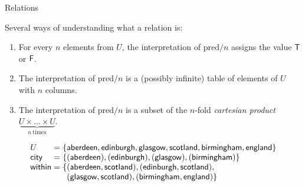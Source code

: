 \documentclass[xetex,aspectratio=169,14pt,hyperref={pdfpagelabels=true,pdflang={en-GB}}]{beamer}
\begin{document}
\begin{frame}
  {Relations}

  Several ways of understanding what a relation is:
  \begin{enumerate}
  \item For every $n$ elements from $U$, the interpretation of
    $\mathrm{pred}/n$ assigns the value $\mathsf{T}$ or $\mathsf{F}$.\\
    \bigskip
  \item The interpretation of $\mathrm{pred}/n$ is a (possibly
    infinite) table of elements of $U$ with $n$ columns.
    \bigskip
  \item The interpretation of $\mathrm{pred}/n$ is a subset of the
    $n$-fold \emph{cartesian product}
    $\underbrace{U \times \dots \times U}_{n~\mathrm{times}}$.\\
  \end{enumerate}
\end{frame}

\begin{frame}
  \begin{displaymath}
    \begin{array}{l@{\hspace{0.3em}}c@{\hspace{0.3em}}l}
      U &=& \{ \mathsf{aberdeen}, \mathsf{edinburgh}, \mathsf{glasgow}, \mathsf{scotland},  \mathsf{birmingham}, \mathsf{england} \}\\
      \mathsf{city} &=& \{ (\mathsf{aberdeen}), (\mathsf{edinburgh}), (\mathsf{glasgow}), (\mathsf{birmingham}) \}\\
      \mathsf{within} &=& \{
                          \begin{array}[t]{@{}l}
                            (\mathsf{aberdeen}, \mathsf{scotland}), (\mathsf{edinburgh}, \mathsf{scotland}), \\
                            (\mathsf{glasgow}, \mathsf{scotland}), (\mathsf{birmingham}, \mathsf{england}) \}
                          \end{array}
    \end{array}
  \end{displaymath}
\end{frame}
\end{document}

